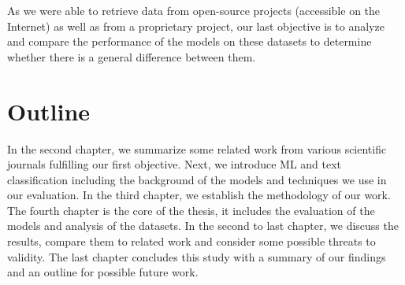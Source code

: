 As we were able to retrieve data from open-source projects (accessible on the Internet) as well as from a proprietary project, our last objective is to analyze and compare the performance of the models on these datasets to determine whether there is a general difference between them.

\section{Outline}

In the second chapter, we summarize some related work from various scientific journals fulfilling our first objective. Next, we introduce ML and text classification including the background of the models and techniques we use in our evaluation. In the third chapter, we establish the methodology of our work. The fourth chapter is the core of the thesis, it includes the evaluation of the models and analysis of the datasets. In the second to last chapter, we discuss the results, compare them to related work and consider some possible threats to validity. The last chapter concludes this study with a summary of our findings and an outline for possible future work.
